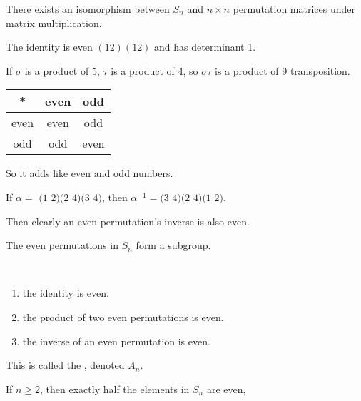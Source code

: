 \documentclass[class=article,crop=false]{standalone}
\begin{document}
\begin{claim}[]
There exists an isomorphism between $ S_n$ and $ n\times n$ permutation matrices under matrix multiplication.
\end{claim}

\begin{note}[]
	The identity is even $ (1 2)(1 2)$ and has determinant 1.
\end{note}

\begin{eg}[]
If $ \sigma$ is a product of 5, $ \tau$ is a product of 4, so $ \sigma \tau$ is a product of 9 transposition.

\begin{table}[H]
	\centering
	\begin{tabular}{c||c|c}
		*& even & odd\\
		\hline
		\hline
		even & even & odd\\
		\hline
		odd& odd & even
	\end{tabular}
\end{table}
So it adds like even and odd numbers.
\end{eg}
\begin{eg}[]
	If $ \alpha = \text{ (1 2)(2 4)(3 4)} $, then $ \alpha^{-1}=\text{(3 4)(2 4)(1 2)}$.
\end{eg}
Then clearly an even permutation's inverse is also even.

\begin{thm}[]
The even permutations in $ S_n$ form a subgroup.
\end{thm}

\begin{prf}
~\begin{enumerate}[label=(\roman*)]
	\item the identity is even.
	\item the product of two even permutations is even.
	\item the inverse of an even permutation is even.
\end{enumerate}
\end{prf}

\begin{defn}[]
This is called the , denoted $ A_n$.
\end{defn}

\begin{claim}[]
If $ n\geq 2$, then exactly half the elements in  $ S_n$ are even,
\end{claim}
\end{document}
